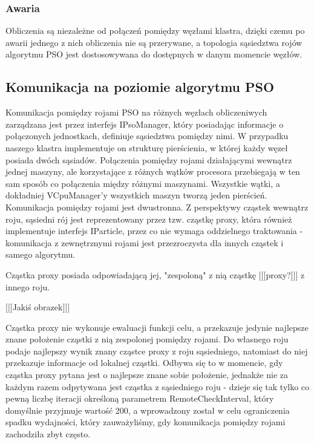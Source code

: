 \documentclass[12pt, twoside, openany, abstract=on]{report}
\theoremstyle{definition}
\begin{document}

\subsubsection{Awaria}
Obliczenia są niezależne od połączeń pomiędzy węzłami klastra, dzięki czemu po awarii jednego z nich obliczenia nie są przerywane, a topologia sąsiedztwa rojów algorytmu PSO jest dostosowywana do dostępnych w danym momencie węzłów.

\subsection{Komunikacja na poziomie algorytmu PSO}
Komunikacja pomiędzy rojami PSO na różnych węzłach obliczeniwych zarządzana jest przez interfejs IPsoManager, który posiadając informacje o połączonych jednostkach, definiuje sąsiedztwa pomiędzy nimi. W przypadku naszego klastra implementuje on strukturę pierścienia, w której każdy węzeł posiada dwóch sąsiadów. Połączenia pomiędzy rojami działającymi wewnątrz jednej maszyny, ale korzystające z różnych wątków procesora przebiegają w ten sam sposób co połączenia między różnymi maszynami. Wszystkie wątki, a dokładniej VCpuManager'y wszystkich maszyn tworzą jeden pierścień. Komunikacja pomiędzy rojami jest dwustronna. Z perspektywy cząstek wewnątrz roju, sąsiedni rój jest reprezentowany przez tzw. cząstkę proxy, która również implementuje interfejs IParticle, przez co nie wymaga oddzielnego traktowania - komunikacja z zewnętrznymi rojami jest przezroczysta dla innych cząstek i samego algorytmu. 

Cząstka proxy posiada odpowiadającą jej, "zespoloną" z nią cząstkę [[[proxy?]]] z innego roju.

[[[Jakiś obrazek]]]

Cząstka proxy nie wykonuje ewaluacji funkcji celu, a przekazuje jedynie najlepsze znane położenie cząstki z nią zespolonej pomiędzy rojami. Do własnego roju podaje najlepszy wynik znany cząstce proxy z roju sąsiedniego, natomiast do niej przekazuje informacje od lokalnej cząstki. Odbywa się to w momencie, gdy cząstka proxy pytana jest o najlepsze znane sobie położenie, jednakże nie za każdym razem odpytywana jest cząstka z sąsiedniego roju - dzieje się tak tylko co pewną liczbę iteracji określoną parametrem RemoteCheckInterval, który domyślnie przyjmuje wartość 200, a wprowadzony został w celu ograniczenia spadku wydajności, który zauważyliśmy, gdy komunikacja pomiędzy rojami zachodziła zbyt często.
\end{document}
